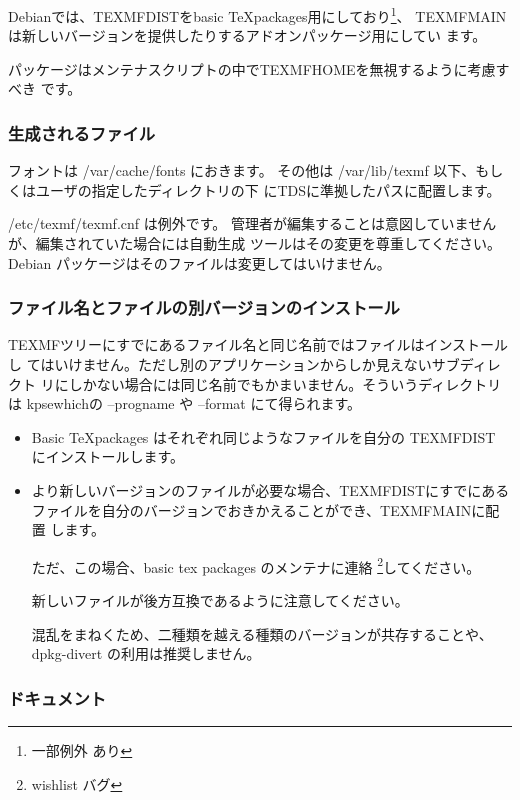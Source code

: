 \documentclass[mingoth,a4paper]{jsarticle}
\begin{document}
Debianでは、TEXMFDISTをbasic \TeX packages用にしており\footnote{一部例外
あり}、
TEXMFMAINは新しいバージョンを提供したりするアドオンパッケージ用にしてい
ます。

パッケージはメンテナスクリプトの中でTEXMFHOMEを無視するように考慮すべき
です。

\subsubsection{生成されるファイル}

フォントは /var/cache/fonts におきます。
その他は  /var/lib/texmf 以下、もしくはユーザの指定したディレクトリの下
にTDSに準拠したパスに配置します。

 /etc/texmf/texmf.cnf は例外です。
管理者が編集することは意図していませんが、編集されていた場合には自動生成
ツールはその変更を尊重してください。
Debian パッケージはそのファイルは変更してはいけません。

\subsubsection{ファイル名とファイルの別バージョンのインストール}

TEXMFツリーにすでにあるファイル名と同じ名前ではファイルはインストールし
てはいけません。ただし別のアプリケーションからしか見えないサブディレクト
リにしかない場合には同じ名前でもかまいません。そういうディレクトリは
kpsewhichの --progname や --format にて得られます。

\begin{itemize}
 \item Basic \TeX packages はそれぞれ同じようなファイルを自分の TEXMFDIST 
	にインストールします。
 \item より新しいバージョンのファイルが必要な場合、TEXMFDISTにすでにある
       ファイルを自分のバージョンでおきかえることができ、TEXMFMAINに配置
       します。

       ただ、この場合、basic tex packages のメンテナに連絡
       \footnote{wishlist バグ}してください。

       新しいファイルが後方互換であるように注意してください。

       混乱をまねくため、二種類を越える種類のバージョンが共存することや、
       dpkg-divert の利用は推奨しません。
\end{itemize}

\subsubsection{ドキュメント}
\end{document}
